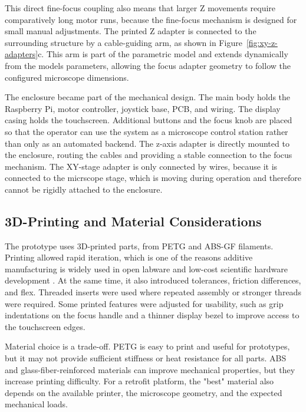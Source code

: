 This direct fine-focus coupling also means that larger Z movements require comparatively long motor runs, because the fine-focus mechanism is designed for small manual adjustments. The printed Z adapter is connected to the surrounding structure by a cable-guiding arm, as shown in Figure~\ref{fig:xy-z-adapters}c. This arm is part of the parametric model and extends dynamically from the models parameters, allowing the focus adapter geometry to follow the configured microscope dimensions.

The enclosure became part of the mechanical design. The main body holds the Raspberry Pi, motor controller, joystick base, PCB, and wiring. The display casing holds the touchscreen. Additional buttons and the focus knob are placed so that the operator can use the system as a microscope control station rather than only as an automated backend. The z-axis adapter is directly mounted to the enclosure, routing the cables and providing a stable connection to the focus mechanism. The XY-stage adapter is only connected by wires, because it is connected to the micrscope stage, which is moving during operation and therefore cannot be rigidly attached to the enclosure.

\subsection{3D-Printing and Material Considerations}

The prototype uses 3D-printed parts, from PETG and ABS-GF filaments. Printing allowed rapid iteration, which is one of the reasons additive manufacturing is widely used in open labware and low-cost scientific hardware development \cite{baden2015openlabware,zhang2013opensourceoptics}. At the same time, it also introduced tolerances, friction differences, and flex. Threaded inserts were used where repeated assembly or stronger threads were required. Some printed features were adjusted for usability, such as grip indentations on the focus handle and a thinner display bezel to improve access to the touchscreen edges.

Material choice is a trade-off. PETG is easy to print and useful for prototypes, but it may not provide sufficient stiffness or heat resistance for all parts. ABS and glass-fiber-reinforced materials can improve mechanical properties, but they increase printing difficulty. For a retrofit platform, the "best" material also depends on the available printer, the microscope geometry, and the expected mechanical loads.

